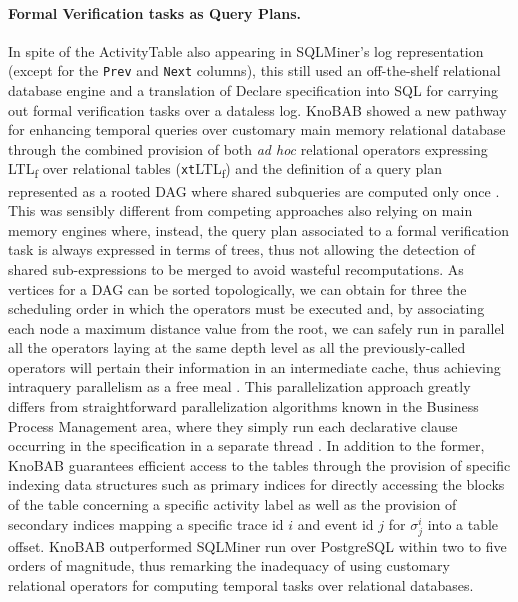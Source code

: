 \documentclass[sigconf]{acmart}
\begin{document}
\paragraph{Formal Verification tasks as Query Plans.} In spite of the ActivityTable also appearing in SQLMiner's log representation \cite{SchonigRCJM16} (except for the \texttt{Prev} and \texttt{Next} columns), this still used an off-the-shelf relational database engine and a translation of Declare specification into SQL for carrying out formal verification tasks over a dataless log. KnoBAB showed a new pathway for enhancing temporal queries over customary main memory relational database through the combined provision of both \textit{ad hoc}  relational operators expressing LTL\textsubscript{f} over relational tables (\texttt{xt}LTL\textsubscript{f}) and the definition of a query plan represented as a rooted DAG where shared subqueries are computed only once \cite{BellatrecheKB21}. This was sensibly different from competing approaches \cite{DBLP:books/sp/22/MurillasRA22,DBLP:books/sp/22/KammererPR22} also relying on main memory engines where, instead, the query plan associated to a formal verification task is always expressed in terms of trees, thus not allowing the detection of shared sub-expressions to be merged to avoid wasteful recomputations. As vertices for a DAG can be sorted topologically, we can obtain for three the scheduling order in which the operators must be executed and, by associating each node a maximum distance value from the root, we can safely run in parallel all the operators laying at the same depth level as all the previously-called operators will pertain their information in an intermediate cache, thus achieving intraquery parallelism as a free meal \cite{info14030173}. This parallelization approach greatly differs from straightforward parallelization algorithms known in the Business Process Management area, where they simply run each declarative clause occurring in the specification in a separate thread \cite{BurattinMS16}. In addition to the former, KnoBAB guarantees efficient access to the tables through the provision of specific indexing data structures such as primary indices for directly accessing the blocks of the table concerning a specific activity label as well as the provision of secondary indices mapping a specific trace id $i$ and event id $j$ for $\sigma^i_j$ into a table offset. KnoBAB outperformed SQLMiner run over PostgreSQL within two to five orders of magnitude, thus remarking the inadequacy of using customary relational operators for computing temporal tasks over relational databases. 
\end{document}
